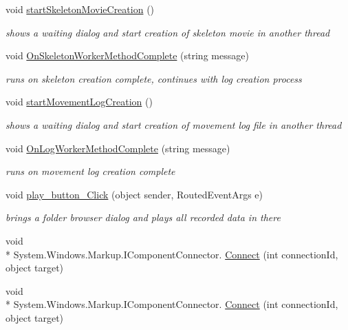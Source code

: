 \begin{DoxyCompactItemize}
void \hyperlink{classUTKinectSkeletonMovementDetector_1_1MainWindow_ada70104856b385a3fd1d03a46987570e}{start\-Skeleton\-Movie\-Creation} ()
\begin{DoxyCompactList}\small\item\em shows a waiting dialog and start creation of skeleton movie in another thread \end{DoxyCompactList}\item 
void \hyperlink{classUTKinectSkeletonMovementDetector_1_1MainWindow_ad60b1ff9b5a4f6ea1c934e291b09bbaa}{On\-Skeleton\-Worker\-Method\-Complete} (string message)
\begin{DoxyCompactList}\small\item\em runs on skeleton creation complete, continues with log creation process \end{DoxyCompactList}\item 
void \hyperlink{classUTKinectSkeletonMovementDetector_1_1MainWindow_a2e5242783864ab44a19fefcad0bbf7f3}{start\-Movement\-Log\-Creation} ()
\begin{DoxyCompactList}\small\item\em shows a waiting dialog and start creation of movement log file in another thread \end{DoxyCompactList}\item 
void \hyperlink{classUTKinectSkeletonMovementDetector_1_1MainWindow_a1874575832de16a05af93078516a60f6}{On\-Log\-Worker\-Method\-Complete} (string message)
\begin{DoxyCompactList}\small\item\em runs on movement log creation complete \end{DoxyCompactList}\item 
void \hyperlink{classUTKinectSkeletonMovementDetector_1_1MainWindow_aa9b03c8c92baa687cb0bc6d8e42839a2}{play\-\_\-button\-\_\-\-Click} (object sender, Routed\-Event\-Args e)
\begin{DoxyCompactList}\small\item\em brings a folder browser dialog and plays all recorded data in there \end{DoxyCompactList}\item 
void \\*
System.\-Windows.\-Markup.\-I\-Component\-Connector. \hyperlink{classUTKinectSkeletonMovementDetector_1_1MainWindow_a3d7ae964fe7e184f9324c6e256b562a0}{Connect} (int connection\-Id, object target)
\item 
void \\*
System.\-Windows.\-Markup.\-I\-Component\-Connector. \hyperlink{classUTKinectSkeletonMovementDetector_1_1MainWindow_a3d7ae964fe7e184f9324c6e256b562a0}{Connect} (int connection\-Id, object target)
\end{DoxyCompactItemize}

